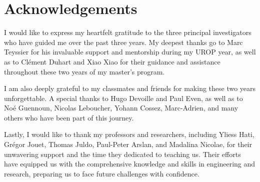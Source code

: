 \vspace*{\fill}

\section*{Acknowledgements}
I would like to express my heartfelt gratitude to the three principal investigators who have guided me over the past three years. My deepest thanks go to Marc Teyssier for his invaluable support and mentorship during my UROP year, as well as to Clément Duhart and Xiao Xiao for their guidance and assistance throughout these two years of my master’s program.

I am also deeply grateful to my classmates and friends for making these two years unforgettable. A special thanks to Hugo Devoille and Paul Even, as well as to Noé Guennoun, Nicolas Leboucher, Yohann Cossez, Marc-Adrien, and many others who have been part of this journey.

Lastly, I would like to thank my professors and researchers, including Yliess Hati, Grégor Jouet, Thomas Juldo, Paul-Peter Arslan, and Madalina Nicolae, for their unwavering support and the time they dedicated to teaching us. Their efforts have equipped us with the comprehensive knowledge and skills in engineering and research, preparing us to face future challenges with confidence.
\vspace*{\fill}
